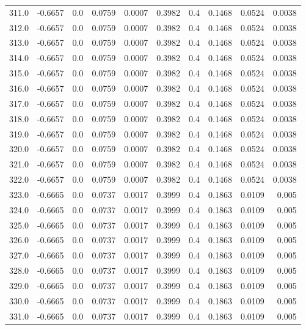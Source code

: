 \begin{longtable}{lrrrrrrrrr}
311.0 & -0.6657 & 0.0 & 0.0759 & 0.0007 & 0.3982 & 0.4 & 0.1468 & 0.0524 & 0.0038 \\
312.0 & -0.6657 & 0.0 & 0.0759 & 0.0007 & 0.3982 & 0.4 & 0.1468 & 0.0524 & 0.0038 \\
313.0 & -0.6657 & 0.0 & 0.0759 & 0.0007 & 0.3982 & 0.4 & 0.1468 & 0.0524 & 0.0038 \\
314.0 & -0.6657 & 0.0 & 0.0759 & 0.0007 & 0.3982 & 0.4 & 0.1468 & 0.0524 & 0.0038 \\
315.0 & -0.6657 & 0.0 & 0.0759 & 0.0007 & 0.3982 & 0.4 & 0.1468 & 0.0524 & 0.0038 \\
316.0 & -0.6657 & 0.0 & 0.0759 & 0.0007 & 0.3982 & 0.4 & 0.1468 & 0.0524 & 0.0038 \\
317.0 & -0.6657 & 0.0 & 0.0759 & 0.0007 & 0.3982 & 0.4 & 0.1468 & 0.0524 & 0.0038 \\
318.0 & -0.6657 & 0.0 & 0.0759 & 0.0007 & 0.3982 & 0.4 & 0.1468 & 0.0524 & 0.0038 \\
319.0 & -0.6657 & 0.0 & 0.0759 & 0.0007 & 0.3982 & 0.4 & 0.1468 & 0.0524 & 0.0038 \\
320.0 & -0.6657 & 0.0 & 0.0759 & 0.0007 & 0.3982 & 0.4 & 0.1468 & 0.0524 & 0.0038 \\
321.0 & -0.6657 & 0.0 & 0.0759 & 0.0007 & 0.3982 & 0.4 & 0.1468 & 0.0524 & 0.0038 \\
322.0 & -0.6657 & 0.0 & 0.0759 & 0.0007 & 0.3982 & 0.4 & 0.1468 & 0.0524 & 0.0038 \\
323.0 & -0.6665 & 0.0 & 0.0737 & 0.0017 & 0.3999 & 0.4 & 0.1863 & 0.0109 & 0.005 \\
324.0 & -0.6665 & 0.0 & 0.0737 & 0.0017 & 0.3999 & 0.4 & 0.1863 & 0.0109 & 0.005 \\
325.0 & -0.6665 & 0.0 & 0.0737 & 0.0017 & 0.3999 & 0.4 & 0.1863 & 0.0109 & 0.005 \\
326.0 & -0.6665 & 0.0 & 0.0737 & 0.0017 & 0.3999 & 0.4 & 0.1863 & 0.0109 & 0.005 \\
327.0 & -0.6665 & 0.0 & 0.0737 & 0.0017 & 0.3999 & 0.4 & 0.1863 & 0.0109 & 0.005 \\
328.0 & -0.6665 & 0.0 & 0.0737 & 0.0017 & 0.3999 & 0.4 & 0.1863 & 0.0109 & 0.005 \\
329.0 & -0.6665 & 0.0 & 0.0737 & 0.0017 & 0.3999 & 0.4 & 0.1863 & 0.0109 & 0.005 \\
330.0 & -0.6665 & 0.0 & 0.0737 & 0.0017 & 0.3999 & 0.4 & 0.1863 & 0.0109 & 0.005 \\
331.0 & -0.6665 & 0.0 & 0.0737 & 0.0017 & 0.3999 & 0.4 & 0.1863 & 0.0109 & 0.005 \\

\end{longtable}
